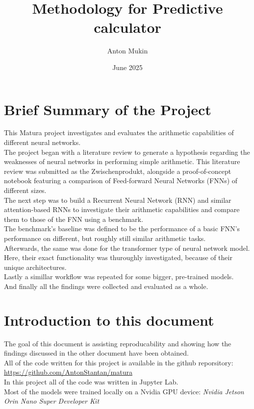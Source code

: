 \documentclass{article}
\title{Methodology for Predictive calculator}
\author{Anton Mukin}
\date{June 2025}
\begin{document}
\maketitle

\section{Brief Summary of the Project}
This Matura project investigates and evaluates the arithmetic capabilities 
of different neural networks. 
\\
The project began with a literature review to 
generate a hypothesis regarding the weaknesses of neural networks in 
performing simple arithmetic. This literature review was submitted as the 
Zwischenprodukt, alongside a proof-of-concept notebook featuring a 
comparison of Feed-forward Neural Networks (FNNs) of different sizes.
\\
The next step was to build a Recurrent Neural Network (RNN) and similar 
attention-based RNNs to investigate their arithmetic capabilities and 
compare them to those of the FNN using a benchmark.
\\
The benchmark's baseline was defined to be the performance of a basic FNN's 
performance on different, but roughly still similar arithmetic tasks.
\\
Afterwards, the same was done for the transformer type of neural network 
model. Here, their exact functionality was thuroughly investigated, because 
of their unique architectures.
\\
Lastly a simillar workflow was repeated for some bigger, pre-trained models. 
\\
And finally all the findings were collected and evaluated as a whole.


\section{Introduction to this document}
The goal of this document is assisting reproducability and showing how the 
findings discussed in the other document have been obtained.
\\[2em]
All of the code written for this project is available in the github 
reporsitory: 
\\
\url{https://github.com/AntonStantan/matura}
\\
In this project all of the code was written in Jupyter Lab. 
\\
Most of the models were trained locally on a Nvidia GPU device: \it{Nvidia 
Jetson Orin Nano Super Developer Kit}
\end{document}
